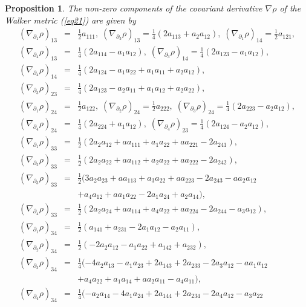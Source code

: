 \documentclass[reqno, 12pt]{amsart}
\numberwithin{equation}{section}
\newtheorem{proposition}[theorem]{Proposition}
\begin{document}
\newpage
\begin{proposition}
The non-zero components of the covariant derivative $\nabla\rho$ 
of the Walker metric  (\ref{eq21})  are given by
\begin{eqnarray*}
(\nabla_{\partial_1}\rho)_{13}&=& \frac{1}{2}a_{111}, \;
(\nabla_{\partial_3}\rho)_{13} = \frac{1}{4}(2a_{113}+a_2a_{12}), \;
(\nabla_{\partial_1}\rho)_{14} = \frac{1}{2}a_{121},\\
(\nabla_{\partial_4}\rho)_{13} &=& \frac{1}{4}(2a_{114}-a_1a_{12}),\;
(\nabla_{\partial_3}\rho)_{14} = \frac{1}{4}(2a_{123}-a_1a_{12}),\\
(\nabla_{\partial_4}\rho)_{14} &=& \frac{1}{4}(2a_{124}-a_1a_{22}+a_1a_{11}+a_2a_{12}),\\
(\nabla_{\partial_3}\rho)_{23} &=& \frac{1}{4}(2a_{123}-a_2a_{11}+a_1a_{12}+a_2a_{22}),\\
(\nabla_{\partial_1}\rho)_{24} &=& \frac{1}{2}a_{122}, \;
(\nabla_{\partial_2}\rho)_{24} = \frac{1}{2}a_{222},\;
(\nabla_{\partial_3}\rho)_{24} = \frac{1}{4}(2a_{223} - a_2a_{12}),\\
(\nabla_{\partial_4}\rho)_{24} &=& \frac{1}{4}(2a_{224} + a_1a_{12}),
\; (\nabla_{\partial_4}\rho)_{23} = \frac{1}{4}(2a_{124}-a_2a_{12}),\\
(\nabla_{\partial_1}\rho)_{33} &=& \frac{1}{2}(2a_2a_{12}+aa_{111}+a_1a_{22}+aa_{221}-2a_{241}),\\
(\nabla_{\partial_2}\rho)_{33}&=& \frac{1}{2}(2a_2a_{22}+aa_{112}+a_2a_{22}+ aa_{222}-2a_{242}),\\
(\nabla_{\partial_3}\rho)_{33}&=& \frac{1}{2}(3a_2a_{23} + aa_{113} 
+ a_3 a_{22} + aa_{223} - 2a_{243} - aa_2a_{12}\\
&& + a_4a_{12} + aa_1a_{22} - 2a_1a_{24} + a_2a_{14}),\\
(\nabla_{\partial_4}\rho)_{33} &=& \frac{1}{2}(2a_2a_{24}+aa_{114}+a_4a_{22}+aa_{224}-2a_{244}-a_3a_{12}),\\
(\nabla_{\partial_1}\rho)_{34} &=& \frac{1}{2}(a_{141}+a_{231}
- 2a_1a_{12} - a_2a_{11}),\\
(\nabla_{\partial_2}\rho)_{34}&=& \frac{1}{2}(-2a_2a_{12}-a_1a_{22}+ a_{142}+a_{232}),\\
(\nabla_{\partial_3}\rho)_{34} &=& \frac{1}{4}(- 4a_2a_{13}
- a_1a_{23} + 2a_{143} + 2a_{233} - 2a_{3}a_{12} - aa_1a_{12}\\
&& + a_4a_{22} + a_1a_{14} + aa_2a_{11} - a_4a_{11}),\\
(\nabla_{\partial_4}\rho)_{34} &=& \frac{1}{4}( - a_2a_{14}  - 4a_1a_{24} 
+ 2a_{144} + 2a_{234} - 2a_4a_{12} - a_3a_{22} \\

\end{eqnarray*}
\end{proposition}
\end{document}
